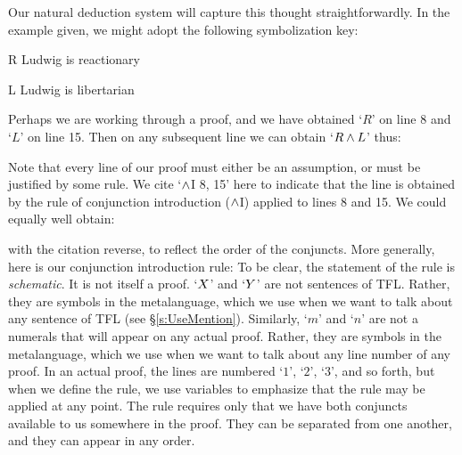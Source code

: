 Our natural deduction system will capture this thought straightforwardly. In the example given, we might adopt the following symbolization key:
	\begin{ekey}
		\item[R] Ludwig is reactionary
		\item[L] Ludwig is libertarian
	\end{ekey}
Perhaps we are working through a proof, and we have obtained `$R$' on line 8 and `$L$' on line 15. Then on any subsequent line we can obtain `$R \wedge L$' thus:
\begin{pf}
	 
\end{pf}
Note that every line of our proof must either be an assumption, or must be justified by some rule. We cite `$\wedge$I 8, 15' here to indicate that the line is obtained by the rule of conjunction introduction ($\wedge$I) applied to lines 8 and 15. We could equally well obtain:
\begin{pf}
	 
\end{pf}
with the citation reverse, to reflect the order of the conjuncts. More generally, here is our conjunction introduction rule:
To be clear, the statement of the rule is \emph{schematic}. It is not itself a proof.  `$X$' and `$Y$' are not sentences of TFL. Rather, they are symbols in the metalanguage, which we use when we want to talk about any sentence of TFL (see \S\ref{s:UseMention}). Similarly, `$m$' and `$n$' are not a numerals that will appear on any actual proof. Rather, they are symbols in the metalanguage, which we use when we want to talk about any line number of any proof. In an actual proof, the lines are numbered `$1$', `$2$', `$3$', and so forth, but when we define the rule, we use variables to emphasize that the rule may be applied at any point. The rule requires only that we have both conjuncts available to us somewhere in the proof. They can be separated from one another, and they can appear in any order. 

